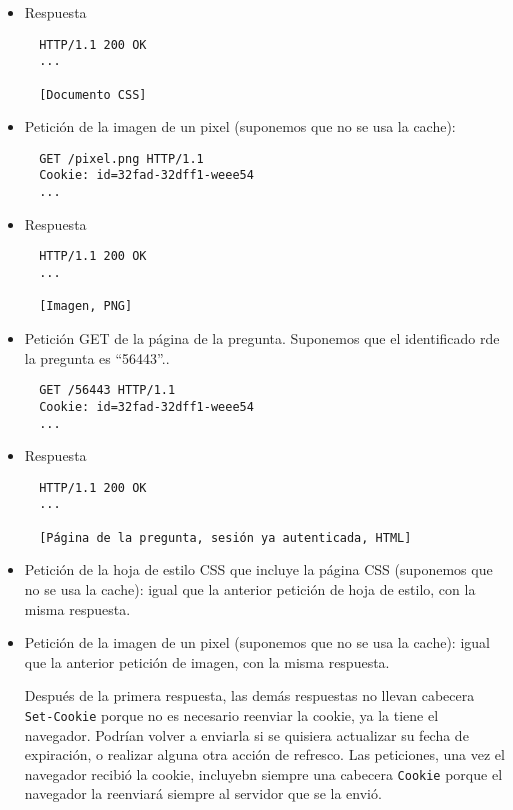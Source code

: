 \begin{itemize}
\item Respuesta

\begin{verbatim}
  HTTP/1.1 200 OK
  ...

  [Documento CSS]
\end{verbatim}

\item Petición de la imagen de un pixel (suponemos que no se usa la cache):

  \begin{verbatim}
  GET /pixel.png HTTP/1.1
  Cookie: id=32fad-32dff1-weee54
  ...
\end{verbatim}

\item Respuesta

\begin{verbatim}
  HTTP/1.1 200 OK
  ...

  [Imagen, PNG]
\end{verbatim}

\item Petición GET de la página de la pregunta. Suponemos que el identificado rde la pregunta es ``56443''.. 

\begin{verbatim}
  GET /56443 HTTP/1.1
  Cookie: id=32fad-32dff1-weee54
  ...
\end{verbatim}

\item Respuesta

\begin{verbatim}
  HTTP/1.1 200 OK
  ...

  [Página de la pregunta, sesión ya autenticada, HTML]
\end{verbatim}
  
\item Petición de la hoja de estilo CSS que incluye la página CSS (suponemos que no se usa la cache): igual que la anterior petición de hoja de estilo, con la misma respuesta.

\item Petición de la imagen de un pixel (suponemos que no se usa la cache):  igual que la anterior petición de imagen, con la misma respuesta.

  Después de la primera respuesta, las demás respuestas no llevan cabecera \texttt{Set-Cookie} porque no es necesario reenviar la cookie, ya la tiene el navegador. Podrían volver a enviarla si se quisiera actualizar su fecha de expiración, o realizar alguna otra acción de refresco. Las peticiones, una vez el navegador recibió la cookie, incluyebn siempre una cabecera \texttt{Cookie} porque el navegador la reenviará siempre al servidor que se la envió.

\end{itemize}

